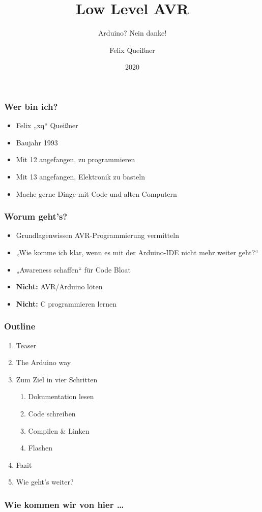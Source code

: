 \documentclass{beamer}
\title{Low Level AVR}
\subtitle{Arduino? Nein danke!}
\author{Felix Queißner}
\institute{shackspace}
\date{2020}
\begin{document}
\frame{\titlepage}

\begin{frame}
\frametitle{Wer bin ich?}
\begin{itemize}
\item Felix „xq“ Queißner
\item Baujahr 1993
\item Mit 12 angefangen, zu programmieren
\item Mit 13 angefangen, Elektronik zu basteln
\item Mache gerne Dinge mit Code und alten Computern
\end{itemize}
\end{frame}

\begin{frame}
\frametitle{Worum geht's?}
\begin{itemize}
\item Grundlagenwissen AVR-Programmierung vermitteln
\item „Wie komme ich klar, wenn es mit der Arduino-IDE nicht mehr weiter geht?“
\item „Awareness schaffen“ für Code Bloat
\item \textbf{Nicht:} AVR/Arduino löten
\item \textbf{Nicht:} C programmieren lernen
\end{itemize}
\end{frame}

\begin{frame}
\frametitle{Outline}
\begin{enumerate}
\item Teaser
\item The Arduino way
\item Zum Ziel in vier Schritten
  \begin{enumerate}
  \item Dokumentation lesen
  \item Code schreiben
  \item Compilen \& Linken
  \item Flashen
  \end{enumerate}
\item Fazit
\item Wie geht's weiter?
\end{enumerate}
\end{frame}

\begin{frame}
\frametitle{Wie kommen wir von hier …}

\end{frame}
\end{document}
